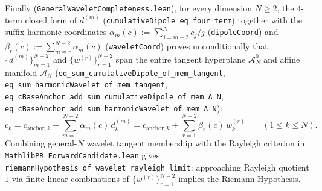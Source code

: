 \documentclass[11pt,a4paper]{article}
\theoremstyle{definition}
\begin{document}
Finally (\texttt{General\allowbreak Wavelet\allowbreak Completeness.lean}), for every dimension $N \ge 2$, the $4$-term closed form of $d^{(m)}$ (\texttt{cumulative\allowbreak Dipole\_\allowbreak eq\_\allowbreak four\_\allowbreak term}) together with the suffix harmonic coordinates $\alpha_m(c) := \sum_{j=m+2}^N c_j / j$ (\texttt{dipole\allowbreak Coord}) and $\beta_r(c) := \sum_{m=r}^{N-2} \alpha_m(c)$ (\texttt{wavelet\allowbreak Coord}) proves unconditionally that $\{d^{(m)}\}_{m=1}^{N-2}$ and $\{w^{(r)}\}_{r=1}^{N-2}$ span the entire tangent hyperplane $\mathcal{A}_N^0$ and affine manifold $\mathcal{A}_N$ (\texttt{eq\_\allowbreak sum\_\allowbreak cumulative\allowbreak Dipole\_\allowbreak of\_\allowbreak mem\_\allowbreak tangent}, \texttt{eq\_\allowbreak sum\_\allowbreak harmonic\allowbreak Wavelet\_\allowbreak of\_\allowbreak mem\_\allowbreak tangent}, \texttt{eq\_\allowbreak cBase\allowbreak Anchor\_\allowbreak add\_\allowbreak sum\_\allowbreak cumulative\allowbreak Dipole\_\allowbreak of\_\allowbreak mem\_\allowbreak A\_\allowbreak N}, \texttt{eq\_\allowbreak cBase\allowbreak Anchor\_\allowbreak add\_\allowbreak sum\_\allowbreak harmonic\allowbreak Wavelet\_\allowbreak of\_\allowbreak mem\_\allowbreak A\_\allowbreak N}):
\begin{equation}
c_k = c_{\mathrm{anchor}, k} + \sum_{m=1}^{N-2} \alpha_m(c)\, d_k^{(m)} = c_{\mathrm{anchor}, k} + \sum_{r=1}^{N-2} \beta_r(c)\, w_k^{(r)} \qquad (1 \le k \le N).
\end{equation}
Combining general-$N$ wavelet tangent membership with the Rayleigh criterion in \texttt{MathlibPR\_\allowbreak Forward\allowbreak Candidate.lean} gives \texttt{riemann\allowbreak Hypothesis\_\allowbreak of\_\allowbreak wavelet\_\allowbreak rayleigh\_\allowbreak limit}: approaching Rayleigh quotient $1$ via finite linear combinations of $\{w^{(r)}\}_{r=1}^{N-2}$ implies the Riemann Hypothesis.
\end{document}
